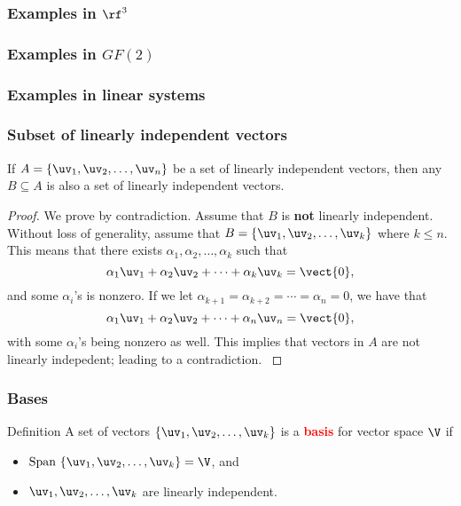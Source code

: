 \begin{frame}
  \frametitle{Examples in $\rf^3$}
\end{frame}

\begin{frame}
  \frametitle{Examples in $GF(2)$}
\end{frame}

\begin{frame}
  \frametitle{Examples in linear systems}
\end{frame}

\begin{frame}
  \frametitle{Subset of linearly independent vectors}
  \begin{lemma}
    If $A=\{\uv_1,\uv_2,\ldots,\uv_n\}$ be a set of linearly
    independent vectors, then any $B\subseteq A$ is also a set of
    linearly independent vectors.
  \end{lemma}
  \begin{proof}
    {\small
      We prove by contradiction.  Assume that $B$ is {\bf not}
      linearly independent.  Without loss of generality, assume that
      $B=\{\uv_1,\uv_2,\ldots,\uv_k\}$ where $k\leq n$.  \pause This
      means that there exists $\alpha_1,\alpha_2,\ldots,\alpha_k$ such
      that
      \[
      \alpha_1\uv_1+\alpha_2\uv_2+\cdots+\alpha_k\uv_k=\vect{0},
      \]
      and some $\alpha_i$'s is nonzero.  \pause If we let
      $\alpha_{k+1}=\alpha_{k+2}=\cdots=\alpha_n=0$, we have that
      \[
      \alpha_1\uv_1+\alpha_2\uv_2+\cdots+\alpha_n\uv_n=\vect{0},
      \]
      with some $\alpha_i$'s being nonzero as well.  \pause This
      implies that vectors in $A$ are not linearly indepedent; leading
      to a contradiction.
    }
  \end{proof}
\end{frame}

\begin{frame}
  \frametitle{Bases}

  \begin{block}{Definition}
    A set of vectors $\{\uv_1,\uv_2,\ldots,\uv_k\}$ is a \textcolor{red}{\bf basis} for vector space $\V$ if
    \begin{itemize}
    \item $\mathrm{Span}~\{\uv_1,\uv_2,\ldots,\uv_k\} = \V$, and
    \item $\uv_1,\uv_2,\ldots,\uv_k$ are linearly independent.
    \end{itemize}
  \end{block}
\end{frame}

